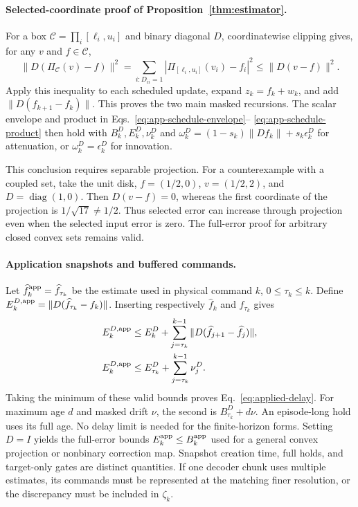 \paragraph{Selected-coordinate proof of Proposition~\ref{thm:estimator}.}
For a box $\mathcal C=\prod_i[\ell_i,u_i]$ and binary diagonal $D$,
coordinatewise clipping gives, for any $v$ and $f\in\mathcal C$,
\begin{equation}
\|D(\Pi_{\mathcal C}(v)-f)\|^2
=\sum_{i:D_{ii}=1}|\Pi_{[\ell_i,u_i]}(v_i)-f_i|^2
\le\|D(v-f)\|^2.
\label{eq:masked-projection}
\end{equation}
Apply this inequality to each scheduled update, expand $z_k=f_k+w_k$,
and add $\|D(f_{k+1}-f_k)\|$. This proves the two main masked recursions.
The scalar envelope and product in Eqs.~\eqref{eq:app-schedule-envelope}--
\eqref{eq:app-schedule-product} then hold with $B_k^D,E_k^D,\nu_k^D$ and
$\omega_k^D=(1-s_k)\|Df_k\|+s_k\epsilon_k^D$ for attenuation, or
$\omega_k^D=\epsilon_k^D$ for innovation.

This conclusion requires separable projection. For a counterexample with a
coupled set, take the unit disk, $f=(1/2,0)$, $v=(1/2,2)$, and
$D=\operatorname{diag}(1,0)$. Then $D(v-f)=0$, whereas the first coordinate
of the projection is $1/\sqrt{17}\ne1/2$. Thus selected error can increase
through projection even when the selected input error is zero. The full-error
proof for arbitrary closed convex sets remains valid.

\paragraph{Application snapshots and buffered commands.}
Let $\widehat f_k^{\rm app}=\widehat f_{\tau_k}$ be the estimate used in
physical command $k$, $0\le\tau_k\le k$. Define
$E_k^{D,\rm app}=\|D(\widehat f_{\tau_k}-f_k)\|$.
Inserting respectively $\widehat f_k$ and $f_{\tau_k}$ gives
\begin{align}
E_k^{D,\rm app}&\le E_k^D+
\sum_{j=\tau_k}^{k-1}\|D(\widehat f_{j+1}-\widehat f_j)\|,
\label{eq:app-delay-increments}\\
E_k^{D,\rm app}&\le E_{\tau_k}^D+\sum_{j=\tau_k}^{k-1}\nu_j^D.
\label{eq:app-delay-age}
\end{align}
Taking the minimum of these valid bounds proves Eq.~\eqref{eq:applied-delay}.
For maximum age $d$ and masked drift $\nu$, the second is
$B_{\tau_k}^D+d\nu$. An episode-long hold uses its full age. No delay
limit is needed for the finite-horizon forms. Setting $D=I$ yields the
full-error bounds $E_k^{\rm app}\le B_k^{\rm app}$ used for a general
convex projection or nonbinary correction map. Snapshot creation time, full
holds, and target-only gates are distinct quantities. If one decoder chunk
uses multiple estimates, its commands must be represented at the matching
finer resolution, or the discrepancy must be included in $\zeta_k$.

